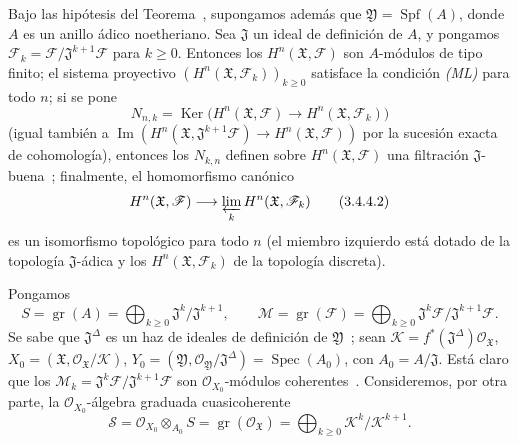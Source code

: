 \begin{corollary}[3.4.4]
\label{III.3.4.4}
\label{III.3.4.4-fr}
Bajo las hipótesis del Teorema~, supongamos además que $\mathfrak Y=\operatorname{Spf}(A)$, donde $A$ es un anillo ádico noetheriano.
Sea $\mathfrak J$ un ideal de definición de $A$, y pongamos $\mathcal F_k=\mathcal F/\mathfrak J^{k+1}\mathcal F$ para $k\geq0$.
Entonces los $H^n(\mathfrak X,\mathcal F)$ son $A$-módulos de tipo finito; el sistema proyectivo $(H^n(\mathfrak X,\mathcal F_k))_{k\geq0}$ satisface la condición \emph{(ML)} para todo $n$; si se pone
\[
N_{n,k}=\operatorname{Ker}\bigl(H^n(\mathfrak X,\mathcal F)
\longrightarrow H^n(\mathfrak X,\mathcal F_k)\bigr)
\tag{3.4.4.1}\label{III.3.4.4.1-fr}
\]
(igual también a $\operatorname{Im}(H^n(\mathfrak X,\mathfrak J^{k+1}\mathcal F)
\to H^n(\mathfrak X,\mathcal F))$ por la sucesión exacta de cohomología), entonces los $N_{k,n}$ definen sobre $H^n(\mathfrak X,\mathcal F)$ una filtración $\mathfrak J$-buena~; finalmente, el homomorfismo canónico
\[
H^n(\mathfrak X,\mathcal F)
\longrightarrow\varprojlim_kH^n(\mathfrak X,\mathcal F_k)
\tag{3.4.4.2}\label{III.3.4.4.2-fr}
\]
es un isomorfismo topológico para todo $n$ (el miembro izquierdo está dotado de la topología $\mathfrak J$-ádica y los $H^n(\mathfrak X,\mathcal F_k)$ de la topología discreta).
\end{corollary}

Pongamos
\[
S=\operatorname{gr}(A)=\bigoplus_{k\geq0}
\mathfrak J^k/\mathfrak J^{k+1},\qquad
\mathcal M=\operatorname{gr}(\mathcal F)=\bigoplus_{k\geq0}
\mathfrak J^k\mathcal F/\mathfrak J^{k+1}\mathcal F.
\tag{3.4.4.3}\label{III.3.4.4.3-fr}
\]
Se sabe que $\mathfrak J^\Delta$ es un haz de ideales de definición de $\mathfrak Y$~; sean $\mathcal K=f^*(\mathfrak J^\Delta)\mathcal O_{\mathfrak X}$, $X_0=(\mathfrak X,\mathcal O_{\mathfrak X}/\mathcal K)$, $Y_0=(\mathfrak Y,\mathcal O_{\mathfrak Y}/\mathfrak J^\Delta)
=\operatorname{Spec}(A_0)$, con $A_0=A/\mathfrak J$.
Está claro que los $\mathcal M_k=\mathfrak J^k\mathcal F/\mathfrak J^{k+1}\mathcal F$ son $\mathcal O_{X_0}$-módulos coherentes~.
Consideremos, por otra parte, la $\mathcal O_{X_0}$-álgebra graduada cuasicoherente
\[
\mathcal S=\mathcal O_{X_0}\otimes_{A_0}S
=\operatorname{gr}(\mathcal O_{\mathfrak X})
=\bigoplus_{k\geq0}\mathcal K^k/\mathcal K^{k+1}.
\tag{3.4.4.4}\label{III.3.4.4.4-fr}
\]

